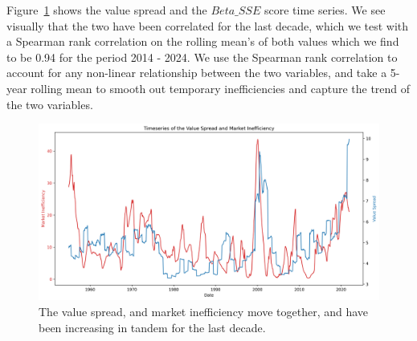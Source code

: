 Figure~\ref{value_spread_beta_sse} shows the value spread and the $Beta\_SSE$ score time series. We see visually that the two have been correlated for the last decade, which we test with a 
Spearman rank correlation on the rolling mean's of both values which we find to be 0.94 for the period 2014 - 2024. We use the Spearman rank correlation to account for any non-linear relationship between the two variables, and
 take a 5-year rolling mean to smooth out temporary inefficiencies and capture the trend of the two variables.

\begin{figure}[h!]
    \centering
    \includegraphics[width=1\textwidth]{../figs/Value Spread and Market Inefficiency.png}
    \caption{The value spread, and market inefficiency move together, and have been increasing in tandem for the last decade.}
    \label{value_spread_beta_sse}
\end{figure}